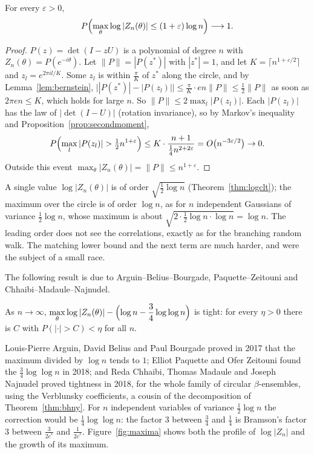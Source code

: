 \begin{theorem}\label{thm:maxupper}
For every $\varepsilon>0$,
\[
P\Bigl(\max_\theta\log|Z_n(\theta)|\le(1+\varepsilon)\log n\Bigr)\longrightarrow1 .
\]
\end{theorem}

\begin{proof}
$P(z)=\det(I-zU)$ is a polynomial of degree $n$ with $Z_n(\theta)=P(e^{-i\theta})$. Let $\|P\|=|P(z^*)|$ with $|z^*|=1$, and let $K=\lceil n^{1+\varepsilon/2}\rceil$ and $z_l=e^{2\pi il/K}$. Some $z_l$ is within $\frac\pi K$ of $z^*$ along the circle, and by
Lemma~\ref{lem:bernstein}, $\bigl||P(z^*)|-|P(z_l)|\bigr|\le\frac\pi K\cdot en\|P\|\le\frac12\|P\|$ as soon as $2\pi en\le K$, which holds for large $n$. So $\|P\|\le2\max_l|P(z_l)|$. Each $|P(z_l)|$ has the law of $|\det(I-U)|$ (rotation
invariance), so by Markov's inequality and Proposition~\ref{prop:secondmoment},
\[
P\Bigl(\max_l|P(z_l)|>\tfrac12n^{1+\varepsilon}\Bigr)\le K\cdot\frac{n+1}{\frac14n^{2+2\varepsilon}}=O\bigl(n^{-3\varepsilon/2}\bigr)\to0 .
\]
Outside this event $\max_\theta|Z_n(\theta)|=\|P\|\le n^{1+\varepsilon}$.
\end{proof}

A single value $\log|Z_n(\theta)|$ is of order $\sqrt{\frac12\log n}$ (Theorem~\ref{thm:logclt}); the maximum over the circle is of order $\log n$, as for $n$ independent Gaussians of variance $\frac12\log n$, whose maximum is about
$\sqrt{2\cdot\frac12\log n\cdot\log n}=\log n$. The leading order does not see the correlations, exactly as for the branching random walk. The matching lower bound and the next term are much harder, and were the subject of a
small race.

The following result is due to Arguin--Belius--Bourgade, Paquette--Zeitouni and Chhaibi--Madaule--Najnudel.
\begin{theorem}[admitted]\label{thm:cuemax}
As $n\to\infty$, $\displaystyle\max_\theta\log|Z_n(\theta)|-\Bigl(\log n-\frac34\log\log n\Bigr)$ is tight: for every $\eta>0$ there is $C$ with $P(|\cdot|>C)<\eta$ for all $n$.
\end{theorem}

Louis-Pierre Arguin, David Belius and Paul Bourgade proved in 2017 that the maximum divided by $\log n$ tends to $1$; Elliot Paquette and Ofer Zeitouni found the $\frac34\log\log n$ in 2018; and Reda Chhaibi, Thomas Madaule and Joseph
Najnudel proved tightness in 2018, for the whole family of circular $\beta$-ensembles, using the Verblunsky coefficients, a cousin of the decomposition of Theorem~\ref{thm:bhny}. For $n$ independent variables of variance $\frac12\log n$ the
correction would be $\frac14\log\log n$: the factor $3$ between $\frac34$ and $\frac14$ is Bramson's factor $3$ between $\frac3{2c^*}$ and $\frac1{2c^*}$. Figure~\ref{fig:maxima} shows both the profile of $\log|Z_n|$ and the growth of its maximum.

